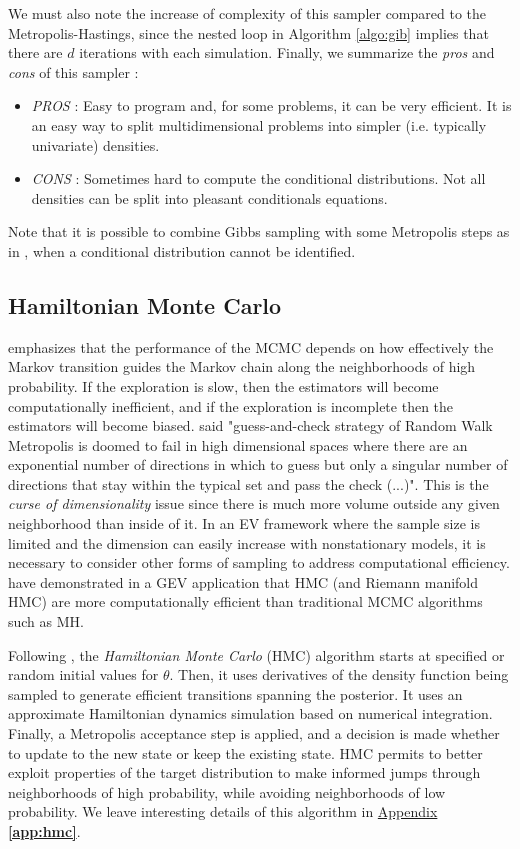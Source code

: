 We must also note the increase of complexity of this sampler compared to the Metropolis-Hastings, since the nested loop in Algorithm \ref{algo:gib} implies that there are $d$ iterations with each simulation. Finally, we summarize the
\emph{pros} and \emph{cons} of this sampler : 

\begin{itemize}
	\item \emph{PROS} : Easy to program and, for some problems, it can be very efficient. It is an easy way to split multidimensional problems into simpler (i.e. typically univariate) densities.
	\item \emph{CONS} : Sometimes hard to compute the conditional distributions. Not all densities can be split into pleasant conditionals equations.
\end{itemize}
Note that it is possible to combine Gibbs sampling with some Metropolis steps as in \cite[chap.11]{Gelman95bayesiandata}, when a conditional distribution cannot be identified.


\subsection{Hamiltonian Monte Carlo}\label{sec:hmc}

\citet{betancourt_diagnosing_2016} emphasizes that the performance of the  MCMC depends on  how effectively the Markov transition guides the Markov chain along the neighborhoods of high probability. If the exploration is slow, then the estimators will become computationally inefficient, and if the exploration is incomplete then the estimators will become biased. \citet{betancourt_2017_con} said "guess-and-check strategy of Random Walk Metropolis is doomed to fail in
high dimensional spaces where there are an exponential number of directions
in which to guess but only a singular number of directions that stay within the
typical set and pass the check (...)". This is the \emph{curse of dimensionality} issue since there is much more volume outside any given neighborhood than inside of it.
In an EV framework where the sample size is limited and the dimension can easily increase with nonstationary models, it is necessary to consider other forms of sampling to address computational efficiency. \cite{hartmann_bayesian_2016} have demonstrated in a GEV application that HMC  (and Riemann manifold HMC) are more computationally efficient than traditional MCMC algorithms such as MH. 


Following \citet[chap.32]{stan_development_team_stan_2012}, the \emph{Hamiltonian Monte Carlo} (HMC)
algorithm starts at specified or random initial values for $\theta$. Then, it uses derivatives of the density function being sampled to generate efficient transitions spanning the posterior. It uses an approximate Hamiltonian dynamics simulation based on numerical integration. 
Finally, a Metropolis acceptance step is applied, and a decision is made whether to update to the new state or keep the existing state. 
HMC permits to better exploit properties of
the target distribution to make informed jumps through neighborhoods of high probability, while avoiding neighborhoods of low probability.  We leave interesting details of this algorithm in \hyperref[app:hmc]{Appendix \textbf{\ref{app:hmc}}}.

